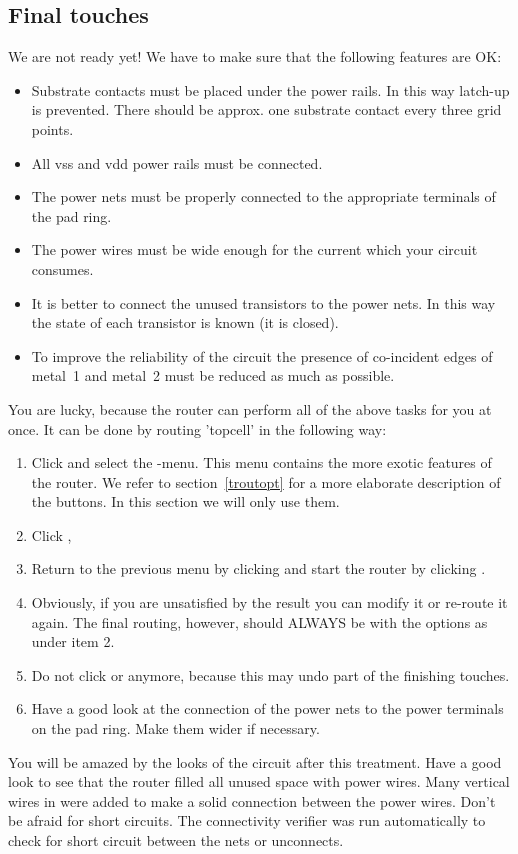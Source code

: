 \subsection{Final touches}
We are not ready yet! We have to make sure that the following features are OK:
\begin{itemize}
\item
Substrate contacts must be placed under the power rails. In this way latch-up
is prevented. There should be approx. one substrate contact every three grid
points.
\item
All vss and vdd power rails must be connected.
\item
The power nets must be properly connected to the appropriate terminals of the
pad ring.
\item
The power wires must be wide enough for the current which your circuit
consumes.
\item
It is better to connect the unused transistors to the power nets.  In this way
the state of each transistor is known (it is closed).
\item
To improve the reliability of the circuit the presence of co-incident edges of
metal~1 and metal~2 must be reduced as much as possible.
\end{itemize}

You are lucky, because the router can perform all of the above tasks for you
at once. It can be done by routing 'topcell' in the following way:
\begin{enumerate}
\item
Click  and select the -menu.  This menu contains
the more exotic features of the router.  We refer to section~\ref{troutopt}
for a more elaborate description of the buttons. In this section we will only
use them.
\item
Click ,
\item
Return to the previous menu by clicking 
and start the router by clicking .
\item
Obviously, if you are unsatisfied by the result you can
modify it or re-route it again. The final routing, however,
should ALWAYS be with the options as under item 2.
\item
Do not click  or  anymore,
because this may undo part of the finishing touches.
\item
Have a good look at the connection of the power nets to the
power terminals on the pad ring. Make them wider if
necessary.
\end{enumerate}
You will be amazed by the looks of the circuit after this treatment.  Have a
good look to see that the router filled all unused space with power wires.
Many vertical wires in
 were added to make a solid connection between
the power wires.  Don't be afraid for short circuits.  The
connectivity verifier was run automatically to check for
short circuit between the nets or unconnects.







